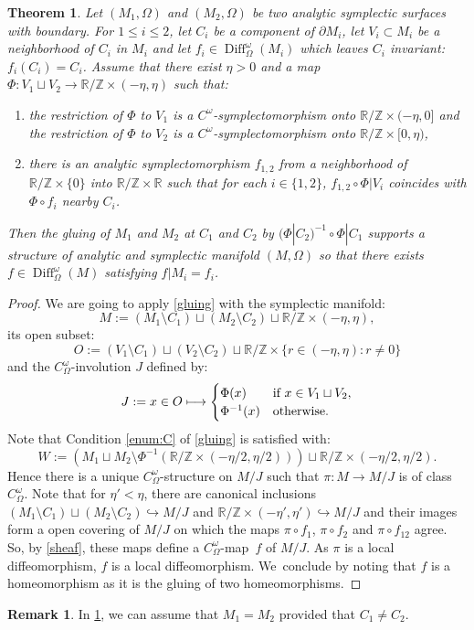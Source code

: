 \documentclass[JEP,XML,SOM,Unicode,NoFloatCountersInSection,Unicode,published]{cedram}
\newcommand\mto{\mathchoice{\longmapsto}{\mapsto}{\mapsto}{\mapsto}}
\newcommand\R{\mathbb R}
\newcommand\Z{\mathbb Z}
\DeclareMathOperator\Diff{Diff}
\newtheorem{theorem}[proposition]{Theorem}
\theoremstyle{definition}
\newtheorem{remark}[proposition]{Remark}
\begin{document}
\label{S23}
\begin{theorem}\label{gluing2}
Let $(M_1,\Omega)$ and $(M_2,\Omega)$ be two analytic symplectic surfaces with boundary. For $1\le i\le 2$, let
$C_i$ be a component of $\partial M_i$, let $V_i\subset M_i$ be a neighborhood of $C_i$ in $M_i$
and let $f_i\in \Diff^\omega_\Omega(M_i)$ which leaves $C_i$ invariant: $f_i(C_i) = C_i$.
Assume that there exist $\eta>0$ and a map $\Phi: V_1\sqcup V_2\to \R/\Z\times (-\eta,\eta)$ such that:
\begin{enumerate}
\item the restriction of $\Phi$ to $V_1$ is a $C^\omega$-symplectomorphism onto
$\R/\Z\times (-\eta, 0]$ and the restriction of $\Phi$ to $V_2$ is a $C^\omega$-symplectomorphism onto $\R/\Z\times [0, \eta)$,
\item there is an analytic symplectomorphism $f_{1,2}$ from a neighborhood of $\R/\Z\times \{0\}$ into $\R/\Z\times \R$ such that for each $i\in \{1,2\}$, $f_{1,2}\circ \Phi|V_i$ coincides with $ \Phi\circ f_i $ nearby $C_i$.
\end{enumerate}
Then the gluing of $M_1$ and $M_2$ at $C_1$ and $C_2$ by $(\Phi|C_2)^{-1}\circ \Phi|C_1$ supports a structure of analytic and symplectic manifold $(M,\Omega)$ so that there exists $f\in \Diff^\omega_\Omega(M)$ satisfying $f|M_i=f_i$.
\end{theorem}
\begin{proof} We are going to apply \cref{gluing} with the symplectic manifold:
\[M:= (M_1\setminus C_1)\sqcup (M_2\setminus C_2)\sqcup \R/\Z\times(-\eta, \eta),\]
its open subset:
\[O:= (V_1\setminus C_1)\sqcup (V_2\setminus C_2)\sqcup \R/\Z\times \{r\in (-\eta, \eta): r\neq 0\} \]
and the $C^\omega_\Omega$-involution $J$ defined by:
\[J:= x\in O\mto
\begin{cases}
\Phi(x) & \text{if } x\in V_1\sqcup V_2,\\
\Phi^{-1}(x) & \text{otherwise}.\\
\end{cases}
\]
Note that Condition \eqref{enum:C} of \cref{gluing} is satisfied with:
\[W:=
\left(M_1\sqcup M_2\setminus \Phi^{-1}(\R/\Z\times (-\eta/2,\eta/2))\right)\sqcup
\R/\Z\times (-\eta/2,\eta/2).\]
Hence there is a unique $C^\omega_\Omega$-structure on $ M/J$ such that $\pi: M\to M/J$ is of class $C^\omega_\Omega$.
Note that for $\eta'<\eta$, there are canonical inclusions
$(M_1\setminus C_1)\sqcup (M_2\setminus C_2)\hookrightarrow M/J$ and $\R/\Z\times (-\eta', \eta')\hookrightarrow M/J$ and their images form a open covering of $M/J$ on which the maps $\pi\circ f_1$, $\pi\circ f_2$ and $\pi\circ f_{12}$ agree. So, by \cref{sheaf}, these maps define a $C^\omega_\Omega$\nobreakdash-map~$f$ of $M/J$. As $\pi$ is a local diffeomorphism, $f$ is a local diffeomorphism. We~conclude by noting that $f$ is a homeomorphism as it is the gluing of two homeomorphisms.
\end{proof}
\begin{remark} In \cref{gluing2}, we can assume that $M_1=M_2$ provided that $C_1\neq C_2$.
\end{remark}
\end{document}
